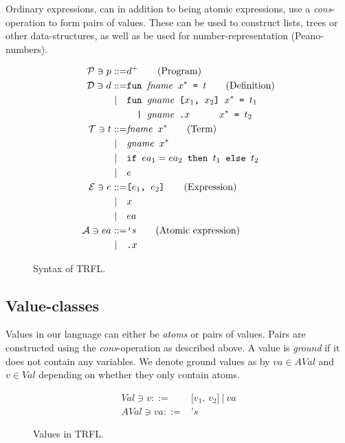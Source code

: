 \documentclass[10pt]{../sigplanconf}
\begin{document}
Ordinary expressions, can in addition to being atomic expressions, use
a \textit{cons}-operation to form pairs of values. These can be used
to construct lists, trees or other data-structures, as well as be used
for number-representation (Peano-numbers).


\begin{figure}\centering
  \begin{align*}
    \mathcal{P} \ni p ::= & d^{+}\tag{Program}\\
    \mathcal{D} \ni d ::= &\texttt{fun \textit{\rmfamily fname} $x^{*}$ = $t$}  \tag{Definition} \\
    | \quad &\texttt{fun \textit{\rmfamily gname} [$x_1$, $x_2$] $x^{*}$ = $t_1$} \\
    & \texttt{\ \ | \textit{\rmfamily gname}\ \texttt{.}$x$ \hspace{.7cm} $x^{*}$ = $t_2$}\\
    \mathcal{T} \ni t ::= & \texttt{\textit{\rmfamily fname} $x^{*}$}  \tag{Term}\\
    | \quad & \texttt{\textit{\rmfamily gname} $x^{*}$} \\
    | \quad & \texttt{if $ea_1 = ea_2$ then $t_1$ else $t_2$} \\
    | \quad & e \\
    \mathcal{E} \ni e ::= & \texttt{[$e_1$, $e_2$]} \tag{Expression}\\
    | \quad & x \\
    | \quad & ea \\
    \mathcal{A} \ni ea ::= & \texttt{'}s \tag{Atomic expression}\\
    | \quad & \texttt{.}x
  \end{align*}
  \caption{Syntax of TRFL.}
\label{fig:bnf}
\end{figure}

\subsection{Value-classes}
Values in our language can either be \textit{atoms} or pairs of
values. Pairs are constructed using the \textit{cons}-operation as
described above. A value is \textit{ground} if it does not contain any
variables. We denote ground values as by $va \in AVal$ and $v \in Val$
depending on whether they only contain atoms.

\begin{figure}\centering
  \begin{align*}
    Val \ni v ::= & \texttt{[$v_1$, $v_2$]}\ |\ va\\
    AVal \ni va ::= & \texttt{'}s
  \end{align*}
  \caption{Values in TRFL.}
\label{fig:bnf}
\end{figure}
\end{document}
